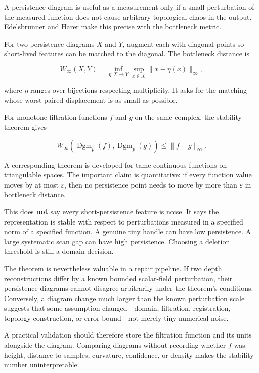 \hypertarget{03-visual-computing-i-ch002-persistence-stability-says-small-function-perturbations-cannot-move-the-diagram-arbitrarily-far}{}

A persistence diagram is useful as a measurement only if a small perturbation of the measured function does not cause arbitrary topological chaos in the output. Edelsbrunner and Harer make this precise with the bottleneck metric.

For two persistence diagrams \(X\) and \(Y\), augment each with diagonal points so short-lived features can be matched to the diagonal. The bottleneck distance is

\[
W_\infty(X,Y)
=
\inf_{\eta:X\to Y}
\sup_{x\in X}
\|x-\eta(x)\|_\infty,
\]

where \(\eta\) ranges over bijections respecting multiplicity. It asks for the matching whose worst paired displacement is as small as possible.

For monotone filtration functions \(f\) and \(g\) on the same complex, the stability theorem gives

\[
W_\infty(
\operatorname{Dgm}_p(f),
\operatorname{Dgm}_p(g)
)
\le
\|f-g\|_\infty.
\]

A corresponding theorem is developed for tame continuous functions on triangulable spaces. The important claim is quantitative: if every function value moves by at most \(\varepsilon\), then no persistence point needs to move by more than \(\varepsilon\) in bottleneck distance.

This does \textbf{not} say every short-persistence feature is noise. It says the representation is stable with respect to perturbations measured in a specified norm of a specified function. A genuine tiny handle can have low persistence. A large systematic scan gap can have high persistence. Choosing a deletion threshold is still a domain decision.

The theorem is nevertheless valuable in a repair pipeline. If two depth reconstructions differ by a known bounded scalar-field perturbation, their persistence diagrams cannot disagree arbitrarily under the theorem's conditions. Conversely, a diagram change much larger than the known perturbation scale suggests that some assumption changed---domain, filtration, registration, topology construction, or error bound---not merely tiny numerical noise.

A practical validation should therefore store the filtration function and its units alongside the diagram. Comparing diagrams without recording whether \(f\) was height, distance-to-samples, curvature, confidence, or density makes the stability number uninterpretable.

